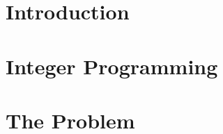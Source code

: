 \documentclass[12pt]{report}
\begin{document}



\tableofcontents
\thispagestyle{empty}

\chapter{Introduction}


\chapter{Integer Programming}


\chapter{The Problem}




\end{document}
